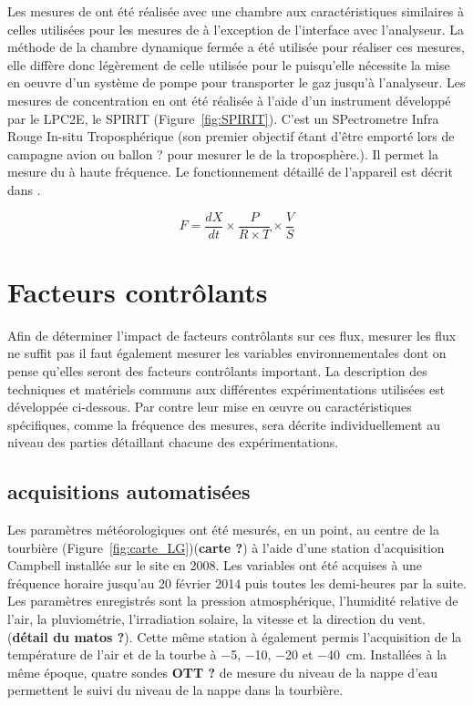 Les mesures de \chh ont été réalisée avec une chambre aux caractéristiques similaires à celles utilisées pour les mesures de \coo à l'exception de l'interface avec l'analyseur.
La méthode de la chambre dynamique fermée a été utilisée pour réaliser ces mesures, elle diffère donc légèrement de celle utilisée pour le \coo puisqu'elle nécessite la mise en oeuvre d'un système de pompe pour transporter le gaz jusqu'à l'analyseur.
Les mesures de concentration en \chh ont été réalisée à l'aide d'un instrument développé par le LPC2E, le SPIRIT (Figure~\ref{fig:SPIRIT}).
C'est un SPectrometre Infra Rouge In-situ Troposphérique (son premier objectif étant d'être emporté lors de campagne avion ou ballon ? pour mesurer le \chh de la troposphère.).
Il permet la mesure du \chh à haute fréquence.
Le fonctionnement détaillé de l'appareil est décrit dans \cite{guimbaud2011}.

\begin{equation}
F = \frac{dX}{dt} \times \frac{P}{R \times T} \times \frac{V}{S}
\end{equation}

%
%


\section{Facteurs contrôlants}
Afin de déterminer l'impact de facteurs contrôlants sur ces flux, mesurer les flux ne suffit pas il faut également mesurer les variables environnementales dont on pense qu'elles seront des facteurs contrôlants important.
La description des techniques et matériels communs aux différentes expérimentations utilisées est développée ci-dessous.
Par contre leur mise en œuvre ou caractéristiques spécifiques, comme la fréquence des mesures, sera décrite individuellement au niveau des parties détaillant chacune des expérimentations.

\subsection{acquisitions automatisées}

Les paramètres météorologiques ont été mesurés, en un point, au centre de la tourbière (Figure~\ref{fig:carte_LG})(\textbf{carte ?}) à l'aide d'une station d'acquisition Campbell installée sur le site en 2008.
Les variables ont été acquises à une fréquence horaire jusqu'au 20 février 2014 puis toutes les demi-heures par la suite. 
Les paramètres enregistrés sont la pression atmosphérique, l'humidité relative de l'air, la pluviométrie, l'irradiation solaire, la vitesse et la direction du vent. (\textbf{détail du matos ?}).
Cette même station à également permis l'acquisition de la température de l'air et de la tourbe à \num{-5}, \num{-10}, \num{-20} et \SIlist{-40}{\cm}.
Installées à la même époque, quatre sondes \textbf{OTT ?} de mesure du niveau de la nappe d'eau permettent le suivi du niveau de la nappe dans la tourbière.

